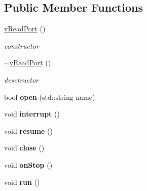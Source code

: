 \subsection*{Public Member Functions}
\begin{DoxyCompactItemize}
\item 
\mbox{\label{classev_1_1vReadPort_a8c559db85d642d2779d2ea02acf75bc9}} 
\hyperlink{classev_1_1vReadPort_a8c559db85d642d2779d2ea02acf75bc9}{v\+Read\+Port} ()
\begin{DoxyCompactList}\small\item\em constructor \end{DoxyCompactList}\item 
\mbox{\label{classev_1_1vReadPort_a7ce21badb00708a6914d8620bf17c797}} 
\hyperlink{classev_1_1vReadPort_a7ce21badb00708a6914d8620bf17c797}{$\sim$v\+Read\+Port} ()
\begin{DoxyCompactList}\small\item\em desctructor \end{DoxyCompactList}\item 
\mbox{\label{classev_1_1vReadPort_a73b4f47c06fac76af81d14a704b35fe4}} 
bool {\bfseries open} (std\+::string name)
\item 
\mbox{\label{classev_1_1vReadPort_a3458fb297eee91f29aa6d719876181b7}} 
void {\bfseries interrupt} ()
\item 
\mbox{\label{classev_1_1vReadPort_ab7356731a6a6818d52f77de0aff5e423}} 
void {\bfseries resume} ()
\item 
\mbox{\label{classev_1_1vReadPort_adcdefc13d430033e876351bd383866bc}} 
void {\bfseries close} ()
\item 
\mbox{\label{classev_1_1vReadPort_a1ff6550f46135f4d0a4e08436d90fa26}} 
void {\bfseries on\+Stop} ()
\item 
\mbox{\label{classev_1_1vReadPort_a383d2b1d3f896fce2fa352f76fe2fefb}} 
void {\bfseries run} ()
\item 
\mbox{\label{classev_1_1vReadPort_a2c6aabe520b140ff5c6bc5f8231cadd5}} 

\end{DoxyCompactItemize}
